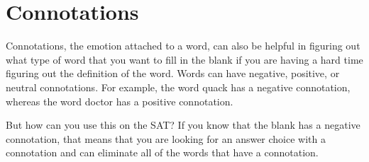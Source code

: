 \section{Connotations}

\begin{spacing}{1.25}
Connotations, the emotion attached to a word, can also be helpful in figuring out what type of word that you want to fill in the blank if you are having a hard time figuring out the definition of the word. Words can have negative, positive, or neutral connotations. For example, the word quack has a negative connotation, whereas the word doctor has a positive connotation.

But how can you use this on the SAT? If you know that the blank has a negative connotation, that means that you are looking for an
\longline answer choice with a connotation and can eliminate all of the words that have a \longline connotation.
\end{spacing}